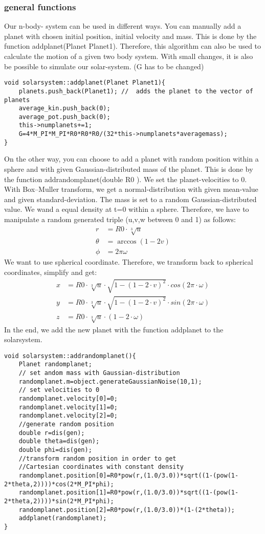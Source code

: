 \documentclass[10pt,a4paper]{article}
\begin{document}
\subsubsection{general functions} 
Our n-body- system can be used in different ways. You can manually add a planet with chosen initial position, initial velocity and mass. This is done by the function addplanet(Planet Planet1). Therefore, this algorithm can also be used to calculate the motion of a given two body system. With small changes, it is also be possible to simulate our solar-system. (G has to be changed)
\begin{lstlisting}
void solarsystem::addplanet(Planet Planet1){
    planets.push_back(Planet1); //  adds the planet to the vector of planets
    average_kin.push_back(0);
    average_pot.push_back(0);
    this->numplanets+=1;
    G=4*M_PI*M_PI*R0*R0*R0/(32*this->numplanets*averagemass);
}
\end{lstlisting}
On the other way, you can choose to add a planet with random position within a sphere and with given Gaussian-distributed mass of the planet. This is done by the function addrandomplanet(double R0 ). We set the planet-velocities to 0. With Box–Muller transform, we get a normal-distribution with given mean-value and given standard-deviation. The mass is set to a random Gaussian-distributed value. We wand a equal density at t=0 within a sphere. Therefore, we have to manipulate a random generated triple (u,v,w between 0 and 1) as follows:
\begin{align*}
r &=R0 \cdot \sqrt[3]{u} \\
\theta &= \arccos(1-2v) \\
\phi &= 2 \pi \omega
\end{align*}
We want to use spherical coordinate. Therefore, we transform back to spherical coordinates, simplify and get:
\begin{align*}
x&=R0 \cdot \sqrt[3]{u} \cdot  \sqrt{1-(1-2\cdot v)^{2} }\cdot cos(2\pi \cdot \omega) \\
y&=R0 \cdot \sqrt[3]{u} \cdot  \sqrt{1-(1-2\cdot v)^{2} }\cdot sin(2\pi \cdot \omega) \\
z &= R0 \cdot \sqrt[3]{u} \cdot (1-2 \cdot \omega )
\end{align*}
In the end, we add the new planet with the function addplanet to the solarsystem. 
\begin{lstlisting}
void solarsystem::addrandomplanet(){
    Planet randomplanet;
    // set andom mass with Gaussian-distribution
    randomplanet.m=object.generateGaussianNoise(10,1);
    // set velocities to 0
    randomplanet.velocity[0]=0;
    randomplanet.velocity[1]=0;
    randomplanet.velocity[2]=0;
    //generate random position
    double r=dis(gen);
    double theta=dis(gen);
    double phi=dis(gen);
    //transform random position in order to get
    //Cartesian coordinates with constant density
    randomplanet.position[0]=R0*pow(r,(1.0/3.0))*sqrt((1-(pow(1-2*theta,2))))*cos(2*M_PI*phi);
    randomplanet.position[1]=R0*pow(r,(1.0/3.0))*sqrt((1-(pow(1-2*theta,2))))*sin(2*M_PI*phi);
    randomplanet.position[2]=R0*pow(r,(1.0/3.0))*(1-(2*theta));
    addplanet(randomplanet);
}
\end{lstlisting}
\end{document}
